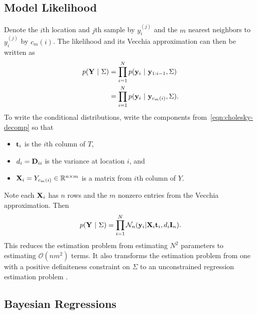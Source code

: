 \documentclass[letterpaper]{article}
\begin{document}
  \subsection{Model Likelihood}\label{subsec:model-likelihood}

  Denote the $i$th location and $j$th sample by $y_{i}^{(j)}$ and the $m$ nearest
  neighbors to $y_{i}^{(j)}$ by $c_{m}(i)$. The likelihood and its Vecchia
  approximation can then be written as
  \begin{align}
    p(\mathbf{Y}\ |\ \Sigma)
    &= \prod_{i=1}^{N} p(\mathbf{y}_{i}\ |\ \mathbf{y}_{1:i-1}, \Sigma) \nonumber \\
    &= \prod_{i=1}^{N} p(\mathbf{y}_{i}\ |\ \mathbf{y}_{c_m(i)}, \Sigma).
    \label{eqn:vecchia-likelihood}
  \end{align}
  To write the conditional distributions, write the components from~\eqref{eqn:cholesky-decomp}
  so that
  \begin{itemize}
    \item $\mathbf{t}_{i}$ is the $i$th column of $T$,
    \item $d_{i} = \mathbf{D}_{ii}$ is the variance at location $i$, and
    \item $\mathbf{X}_{i} = Y_{c_m(i)} \in \mathbb{R}^{n \times m}$ is a matrix from $i$th column of $Y$. 
  \end{itemize}
  Note each $\mathbf{X}_{i}$ has $n$ rows and the $m$ nonzero entries from the Vecchia
  approximation. Then
  \begin{equation}
    p(\mathbf{Y}\ |\ \Sigma) = \prod_{i=1}^{N}
    \mathcal{N}_n(\mathbf{y}_{i} | \mathbf{X}_{i}\mathbf{t}_{i}, d_{i}\mathbf{I}_{n}).
    \label{eqn:conditional-likelihood}
  \end{equation}
  This reduces the estimation problem from estimating $N^2$ parameters to estimating
  $\mathcal{O}(nm^2)$ terms. It also transforms the estimation problem from one
  with a positive definiteness constraint on $\Sigma$ to an unconstrained
  regression estimation problem \citep{Pourahmadi2011}.

  \subsection{Bayesian Regressions}\label{subsec:bayes-regressions}
\end{document}
